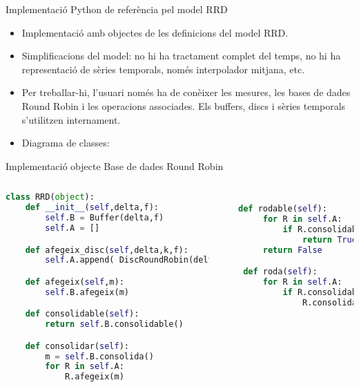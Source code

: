 \begin{frame} 
{Implementació Python de referència pel model RRD} 


\begin{itemize}

\item Implementació amb objectes de les definicions del model RRD.

\item Simplificacions del model: no hi ha tractament complet del temps, no hi ha representació de sèries temporals, només interpolador mitjana, etc.

\item Per treballar-hi, l'usuari només ha de conèixer les mesures, les bases de dades Round Robin i les operacions associades. Els buffers, discs i sèries temporals s'utilitzen internament.

\item Diagrama de classes:

\end{itemize}

\begin{center}
       \tiny
       \setlength{\unitlength}{0.2mm}
%        
       \normalsize
\end{center}

\end{frame}

\begin{frame}[fragile] 
{Implementació objecte Base de dades Round Robin}

\begin{columns}
\column{6cm}
\begin{lstlisting}[language=python]
class RRD(object):
    def __init__(self,delta,f):
        self.B = Buffer(delta,f)
        self.A = []

    def afegeix_disc(self,delta,k,f):
        self.A.append( DiscRoundRobin(delta,k,f) )

    def afegeix(self,m):
        self.B.afegeix(m)

    def consolidable(self):
        return self.B.consolidable()

    def consolidar(self):
        m = self.B.consolida()
        for R in self.A:
            R.afegeix(m)


\end{lstlisting}

\column{5cm}

\begin{lstlisting}[language=python]

   def rodable(self):
        for R in self.A:
            if R.consolidable():
                return True
        return False

    def roda(self):
        for R in self.A:
            if R.consolidable():
                R.consolida()

\end{lstlisting}

\end{columns}

\end{frame}



